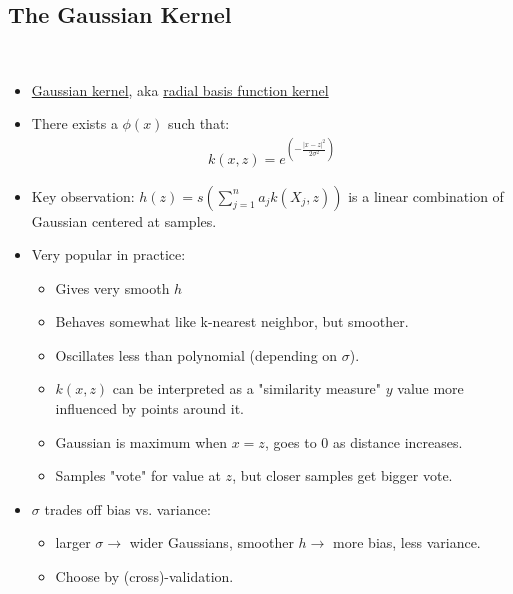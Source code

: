 \documentclass[10pt]{article}
\begin{document}
	\subsection*{The Gaussian Kernel}
	\
	\begin{itemize}
		\item \underline{Gaussian kernel}, aka \underline{radial basis function kernel}
		\item There exists a $\phi(x)$ such that:
			\begin{align*}
				k(x, z) = e^{(-\frac{|x-z|^{2}}{2\sigma^{2}})}
			\end{align*}
		\item Key observation: $h(z) = s(\sum_{j=1}^{n} a_{j}k(X_{j}, z))$ is a linear combination of Gaussian centered at samples.
		\item Very popular in practice:
			\begin{itemize}
				\item Gives very smooth $h$
				\item Behaves somewhat like k-nearest neighbor, but smoother.
				\item Oscillates less than polynomial (depending on $\sigma$).
				\item $k(x,z)$ can be interpreted as a "similarity measure" $y$ value more influenced by points around it.
				\item Gaussian is maximum when $x=z$, goes to 0 as distance increases.
				\item Samples "vote" for value at $z$, but closer samples get bigger vote.
			\end{itemize}
		\item $\sigma$ trades off bias vs. variance:
			\begin{itemize}
				\item larger $\sigma \rightarrow$ wider Gaussians, smoother $h \rightarrow$ more bias, less variance.
				\item Choose by (cross)-validation.
			\end{itemize}
	\end{itemize}
\end{document}
